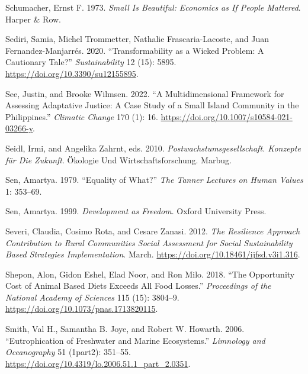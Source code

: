 \documentclass[
  a4paper,
  DIV=11,
  numbers=noendperiod,
  oneside,
  openany]{scrreprt}
\newlength{\cslhangindent}
\newenvironment{CSLReferences}[2] %
 {\begin{list}{}{%
  \setlength{\itemindent}{0pt}
  \setlength{\leftmargin}{0pt}
  \setlength{\parsep}{0pt}
  \ifodd #1
   \setlength{\leftmargin}{\cslhangindent}
   \setlength{\itemindent}{-1\cslhangindent}
  \fi
  \setlength{\itemsep}{#2\baselineskip}}}
 {\end{list}}
\begin{document}
\begin{CSLReferences}{1}{1}
Schumacher, Ernst F. 1973. \emph{Small Is {Beautiful}: {Economics} as If
{People Mattered}}. Harper \& Row.

Sediri, Samia, Michel Trommetter, Nathalie Frascaria-Lacoste, and Juan
Fernandez-Manjarrés. 2020. {``Transformability as a {Wicked Problem}: {A
Cautionary Tale}?''} \emph{Sustainability} 12 (15): 5895.
\url{https://doi.org/10.3390/su12155895}.

See, Justin, and Brooke Wilmsen. 2022. {``A Multidimensional Framework
for Assessing Adaptative Justice: A Case Study of a Small Island
Community in the {Philippines}.''} \emph{Climatic Change} 170 (1): 16.
\url{https://doi.org/10.1007/s10584-021-03266-y}.

Seidl, Irmi, and Angelika Zahrnt, eds. 2010.
\emph{Postwachstumsgesellschaft. {Konzepte} f{ü}r Die {Zukunft}}.
{Ö}kologie Und {Wirtschaftsforschung}. Marbug.

Sen, Amartya. 1979. {``Equality of {What}?''} \emph{The Tanner Lectures
on Human Values} 1: 353--69.

Sen, Amartya. 1999. \emph{Development as Freedom}. Oxford University
Press.

Severi, Claudia, Cosimo Rota, and Cesare Zanasi. 2012. \emph{The
{Resilience Approach Contribution} to {Rural Communities Social
Assessment} for {Social Sustainability Based Strategies
Implementation}}. March. \url{https://doi.org/10.18461/ijfsd.v3i1.316}.

Shepon, Alon, Gidon Eshel, Elad Noor, and Ron Milo. 2018. {``The
Opportunity Cost of Animal Based Diets Exceeds All Food Losses.''}
\emph{Proceedings of the National Academy of Sciences} 115 (15):
3804--9. \url{https://doi.org/10.1073/pnas.1713820115}.

Smith, Val H., Samantha B. Joye, and Robert W. Howarth. 2006.
{``Eutrophication of Freshwater and Marine Ecosystems.''}
\emph{Limnology and Oceanography} 51 (1part2): 351--55.
\url{https://doi.org/10.4319/lo.2006.51.1_part_2.0351}.


\end{CSLReferences}
\end{document}
